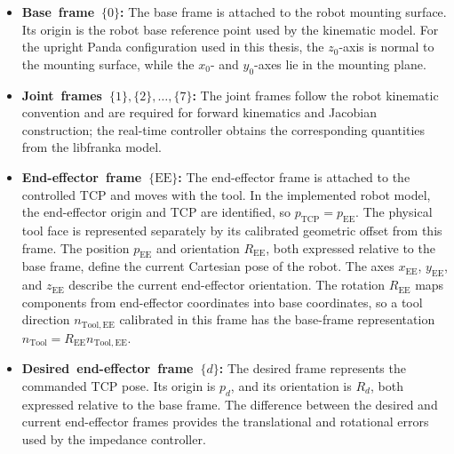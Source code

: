 \begin{itemize}
  \item \mbox{\textbf{Base frame \mbox{\(\{0\}\)}:}}
        The base frame is attached to the robot mounting surface. Its origin is
        the robot base reference point used by the kinematic model. For the
        upright Panda configuration used in this thesis, the \mbox{\(z_0\)}-axis is
        normal to the mounting surface, while the \mbox{\(x_0\)}- and \mbox{\(y_0\)}-axes
        lie in the mounting plane.

  \item \mbox{\textbf{Joint frames
        \mbox{\(\{1\},\{2\},\ldots,\{7\}\)}:}}
        The joint frames follow the robot kinematic convention and are required
        for forward kinematics and Jacobian construction; the real-time
        controller obtains the corresponding quantities from the libfranka
        model.

  \item \mbox{\textbf{End-effector frame
        \mbox{\(\{\mathrm{EE}\}\)}:}}
        The end-effector frame is attached to the controlled TCP and moves with
        the tool. In the implemented robot model, the end-effector origin and
        TCP are identified, so \mbox{\(p_{\mathrm{TCP}}=p_{\mathrm{EE}}\)}. The
        physical tool face is represented separately by its calibrated
        geometric offset from this frame. The position
        \mbox{\(p_{\mathrm{EE}}\)} and orientation
        \mbox{\(R_{\mathrm{EE}}\)}, both expressed relative to the base frame,
        define the current Cartesian pose of the robot. The axes
        \mbox{\(x_{\mathrm{EE}}\)}, \mbox{\(y_{\mathrm{EE}}\)}, and
        \mbox{\(z_{\mathrm{EE}}\)} describe the current end-effector
        orientation. The rotation \mbox{\(R_{\mathrm{EE}}\)} maps components
        from end-effector coordinates into base coordinates, so a tool
        direction \mbox{\(n_{\mathrm{Tool,EE}}\)} calibrated in this frame
        has the base-frame representation
        \mbox{\(n_{\mathrm{Tool}}=R_{\mathrm{EE}}n_{\mathrm{Tool,EE}}\)}.

  \item \mbox{\textbf{Desired end-effector frame \mbox{\(\{d\}\)}:}}
        The desired frame represents the commanded TCP pose. Its origin is
        \mbox{\(p_d\)}, and its orientation is \mbox{\(R_d\)}, both expressed relative to
        the base frame. The difference between the desired and current
        end-effector frames provides the translational and rotational errors
        used by the impedance controller.


\end{itemize}
